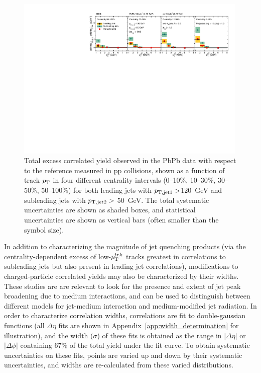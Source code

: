 \begin{figure}[hbtp]
\begin{center}
\includegraphics[width=0.99\textwidth]{figures/Results/PAS_Figure_7_WithInclusive.pdf}
\caption[Integrated charged particle yields for inclusive, leading, and subleading jets]{Total excess correlated yield observed in the PbPb data with respect to the reference measured in pp collisions, shown as a function of track $p_{\rm T}$ in four different centrality intervals (0--10\%, 10--30\%, 30--50\%, 50--100\%) for both leading jets with $p_{\rm T, jet1}> $120~GeV and subleading jets with $p_{\rm T, jet2}>$ 50~GeV. The total systematic uncertainties are shown as shaded boxes, and statistical uncertainties are shown as vertical bars (often smaller than the symbol size).}
\label{fig:Excess_vs_trkpt}
\end{center}
\end{figure}

\clearpage

In addition to characterizing the magnitude of jet quenching products (via the centrality-dependent excess of low-$p_{\rm T}^{trk}$ tracks greatest in correlations to subleading jets but also present in leading jet correlations), modifications to charged-particle correlated yields may also be characterized by their widths.  These studies are are relevant to look for the presence and extent of jet peak broadening due to medium interactions, and can be used to distinguish between different models for jet-medium interaction and medium-modified jet radiation.  In order to characterize correlation widths, correlations are fit to double-gaussian functions (all $\Delta\eta$ fits are shown in Appendix~\ref{app:width_determination} for illustration), and the width ($\sigma$) of these fits is obtained as the range in $|\Delta\eta|$ or $|\Delta\phi|$ containing 67\% of the total yield under the fit curve.   To obtain systematic uncertainties on these fits, points are varied up and down by their systematic uncertainties, and widths are re-calculated from these varied distributions.  

